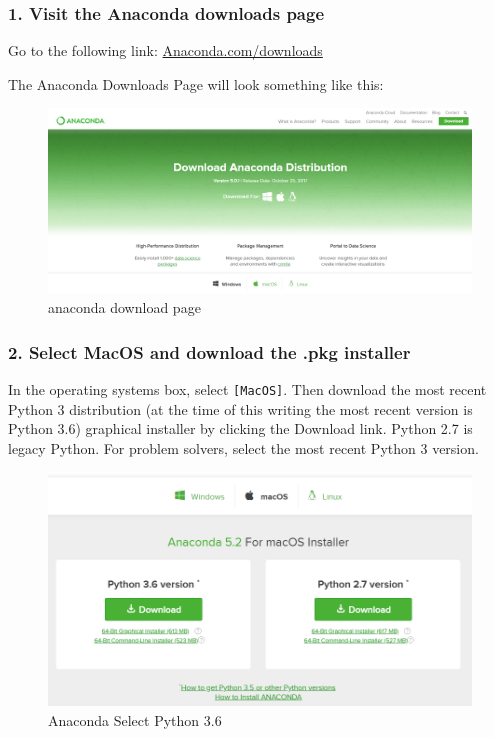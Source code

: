 \documentclass{book}
\makeatletter
\def\maxwidth{\ifdim\Gin@nat@width>\linewidth\linewidth
    \else\Gin@nat@width\fi}
\let\Oldincludegraphics\includegraphics
\renewcommand{\includegraphics}[1]{\Oldincludegraphics[width=.8\maxwidth]{#1}}
\makeatother
\begin{document}
    \subsubsection{1. Visit the Anaconda downloads
page}\label{visit-the-anaconda-downloads-page}

Go to the following link:
\href{https://www.anaconda.com/download/}{Anaconda.com/downloads}

The Anaconda Downloads Page will look something like this:

\begin{figure}
\centering
\includegraphics{images/anaconda_download_page.png}
\caption{anaconda download page}
\end{figure}

    \subsubsection{2. Select MacOS and download the .pkg
installer}\label{select-macos-and-download-the-.pkg-installer}

In the operating systems box, select \lstinline![MacOS]!. Then download
the most recent Python 3 distribution (at the time of this writing the
most recent version is Python 3.6) graphical installer by clicking the
Download link. Python 2.7 is legacy Python. For problem solvers, select
the most recent Python 3 version.

\begin{figure}
\centering
\includegraphics{images/anaconda_download_mac.png}
\caption{Anaconda Select Python 3.6}
\end{figure}
\end{document}
